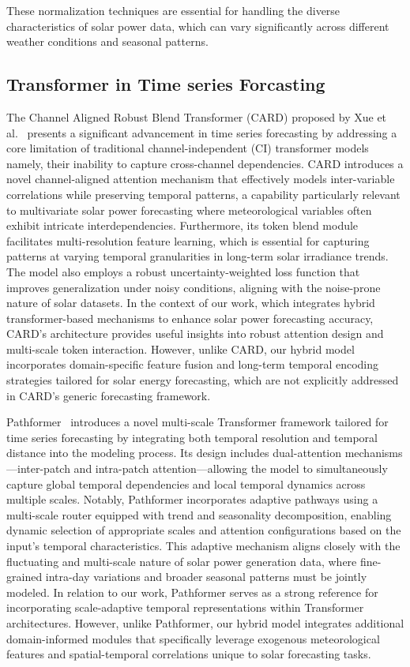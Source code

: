 \documentclass[12pt]{uomthesis}
\begin{document}
These normalization techniques are essential for handling the diverse characteristics of solar power data, which can vary significantly across different weather conditions and seasonal patterns.

 \subsection{Transformer in Time series Forcasting}

The Channel Aligned Robust Blend Transformer (CARD) proposed by Xue et al.~\cite{xue2023card} presents a significant advancement in time series forecasting by addressing a core limitation of traditional channel-independent (CI) transformer models namely, their inability to capture cross-channel dependencies. CARD introduces a novel channel-aligned attention mechanism that effectively models inter-variable correlations while preserving temporal patterns, a capability particularly relevant to multivariate solar power forecasting where meteorological variables often exhibit intricate interdependencies. Furthermore, its token blend module facilitates multi-resolution feature learning, which is essential for capturing patterns at varying temporal granularities in long-term solar irradiance trends. The model also employs a robust uncertainty-weighted loss function that improves generalization under noisy conditions, aligning with the noise-prone nature of solar datasets. In the context of our work, which integrates hybrid transformer-based mechanisms to enhance solar power forecasting accuracy, CARD's architecture provides useful insights into robust attention design and multi-scale token interaction. However, unlike CARD, our hybrid model incorporates domain-specific feature fusion and long-term temporal encoding strategies tailored for solar energy forecasting, which are not explicitly addressed in CARD's generic forecasting framework.

Pathformer~\cite{chen2024pathformer} introduces a novel multi-scale Transformer framework tailored for time series forecasting by integrating both temporal resolution and temporal distance into the modeling process. Its design includes dual-attention mechanisms—inter-patch and intra-patch attention—allowing the model to simultaneously capture global temporal dependencies and local temporal dynamics across multiple scales. Notably, Pathformer incorporates adaptive pathways using a multi-scale router equipped with trend and seasonality decomposition, enabling dynamic selection of appropriate scales and attention configurations based on the input's temporal characteristics. This adaptive mechanism aligns closely with the fluctuating and multi-scale nature of solar power generation data, where fine-grained intra-day variations and broader seasonal patterns must be jointly modeled. In relation to our work, Pathformer serves as a strong reference for incorporating scale-adaptive temporal representations within Transformer architectures. However, unlike Pathformer, our hybrid model integrates additional domain-informed modules that specifically leverage exogenous meteorological features and spatial-temporal correlations unique to solar forecasting tasks.
\end{document}
